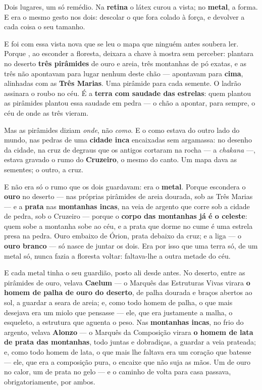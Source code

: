 \documentclass[livro.tex]{subfiles}
\begin{document}
\medskip

Dois lugares, um só remédio. Na \textbf{retina} o látex curou a vista; no \textbf{metal},
a forma. E era o mesmo gesto nos dois: descolar o que fora colado à força, e devolver a
cada coisa o seu tamanho.

\medskip

E foi com essa vista nova que se leu o mapa que ninguém antes soubera ler. Porque
\Ven , ao esconder a floresta, deixara a chave à mostra sem perceber: plantara no
deserto \textbf{três pirâmides} de ouro e areia, três montanhas de pó exatas, e as três
não apontavam para lugar nenhum deste chão --- apontavam para \textbf{cima}, alinhadas
com as \textbf{Três Marias}. Uma pirâmide para cada semente. O ladrão assinara o roubo
no céu. É a \textbf{terra com saudade das estrelas}: quem plantou as pirâmides plantou
essa saudade em pedra --- o chão a apontar, para sempre, o céu de onde as três vieram.

\medskip

Mas as pirâmides diziam \emph{onde}, não \emph{como}. E o como estava do outro lado do
mundo, nas pedras de uma \textbf{cidade inca} encaixadas sem argamassa: no desenho da
cidade, na cruz de degraus que os antigos cortaram na rocha --- a \emph{chakana} ---,
estava gravado o rumo do \textbf{Cruzeiro}, o mesmo do canto. Um mapa dava
as sementes; o outro, a cruz.

\medskip

E não era só o rumo que os dois guardavam: era o \textbf{metal}. Porque \Ven escondera
o \textbf{ouro} no deserto --- nas próprias pirâmides de areia dourada, sob as Três
Marias --- e a \textbf{prata} nas \textbf{montanhas incas}, na veia de argento que corre
sob a cidade de pedra, sob o Cruzeiro --- porque o \textbf{corpo das montanhas já é o
celeste}: quem sobe a montanha sobe ao céu, e a prata que dorme no cume é uma estrela
presa na pedra. Ouro embaixo de Órion, prata debaixo da cruz; e a liga --- o
\textbf{ouro branco} --- só nasce de juntar os dois. Era por isso que uma
terra só, de um metal só, nunca fazia a floresta voltar: faltava-lhe a outra metade do
céu.

\medskip

E cada metal tinha o seu guardião, posto ali desde antes. No deserto, entre as pirâmides
de ouro, velava \textbf{Caelum} --- o Marquês das Estruturas Vivas virara \textbf{o homem de
palha de ouro do deserto}, de palha dourada e braços abertos ao sol, a guardar a seara de
areia; e, como todo homem de palha, o que mais desejava era um miolo que pensasse --- ele, que era justamente
a malha, o esqueleto, a estrutura que aguenta o peso. Nas \textbf{montanhas incas}, no frio
do argento, velava \textbf{Alonzo} --- o Marquês da Composição virara \textbf{o homem de lata
de prata das montanhas}, todo juntas e dobradiças, a guardar a veia prateada; e, como todo homem de lata,
o que mais lhe faltava era um coração que batesse --- ele, que era a composição pura, o
encaixe que não suja as mãos. Um de ouro no calor, um de prata no gelo --- e o caminho de
volta para casa passava, obrigatoriamente, por ambos.
\end{document}
